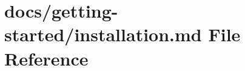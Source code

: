 \hypertarget{installation_8md}{}\section{docs/getting-\/started/installation.md File Reference}
\label{installation_8md}
